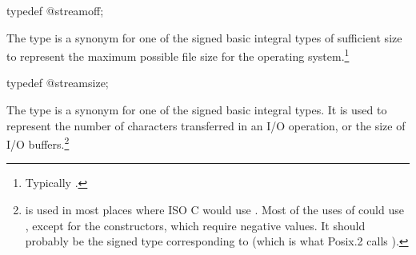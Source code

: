 %
\begin{itemdecl}
typedef @\impdef@ streamoff;
\end{itemdecl}

\begin{itemdescr}
\pnum
The type  is a synonym for one of the signed basic integral types of
sufficient size to represent the maximum possible file size for the operating system.\footnote{Typically .}
\end{itemdescr}

%
\begin{itemdecl}
typedef @\impdef@ streamsize;
\end{itemdecl}

\begin{itemdescr}
\pnum
The type
is a synonym for one of the signed basic
integral types.
It is used to represent the number of characters transferred in an I/O
operation, or the size of I/O buffers.\footnote{
is used in most places where ISO C would use
.
Most of the uses of
could use
,
except for the
constructors, which require negative values.
It should probably be the signed type corresponding to
(which is what Posix.2 calls
).}
\end{itemdescr}

